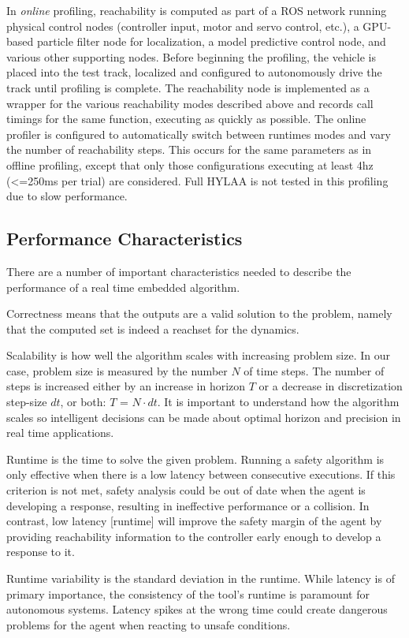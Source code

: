 \documentclass[runningheads]{llncs}
\begin{document}
In \textit{online} profiling, reachability is computed as part of a ROS network running physical control nodes (controller input, motor and servo control, etc.), a GPU-based particle filter node for localization, a model predictive control node, and various other supporting nodes. 
Before beginning the profiling, the vehicle is placed into the test track, localized and configured to autonomously drive the track until profiling is complete. 
The reachability node is implemented as a wrapper for the various reachability modes described above and records call timings for the same function, executing as quickly as possible. 
The online profiler is configured to automatically switch between runtimes modes and vary the number of reachability steps. This occurs for the same parameters as in offline profiling, except that only those configurations executing at least 4hz (<=250ms per trial) are considered. Full HYLAA is not tested in this profiling due to slow performance.

\subsection{Performance Characteristics}
There are a number of important characteristics needed to describe the performance of a real time embedded algorithm.

Correctness means that the outputs are a valid solution to the problem, namely that the computed set is indeed a reachset for the dynamics.

Scalability is how well the algorithm scales with increasing problem size. In our case, problem size is measured by the number $N$ of time steps. The number of steps is increased either by an increase in horizon $T$ or a decrease in discretization step-size $dt$, or both: $T$ = $N\cdot dt$. It is important to understand how the algorithm scales so intelligent decisions can be made about optimal horizon and precision in real time applications.

Runtime is the time to solve the given problem. 
Running a safety algorithm is only effective when there is a low latency between consecutive executions. If this criterion is not met, safety analysis could be out of date when the agent is developing a response, resulting in ineffective performance or a collision. 
In contrast, low latency [runtime] will improve the safety margin of the agent by providing reachability information to the controller early enough to develop a response to it.

Runtime variability is the standard deviation in the runtime. While latency is of primary importance, the consistency of the tool's runtime is paramount for autonomous systems. 
Latency spikes at the wrong time could create dangerous problems for the agent when reacting to unsafe conditions. 
\end{document}
